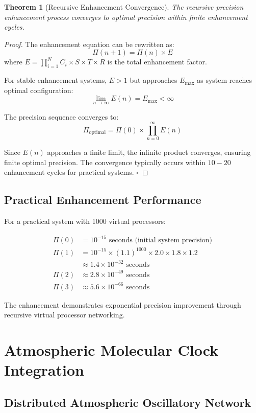 \documentclass[12pt,a4paper]{article}
\newtheorem{theorem}{Theorem}
\begin{document}
\begin{theorem}[Recursive Enhancement Convergence]
The recursive precision enhancement process converges to optimal precision within finite enhancement cycles.
\end{theorem}

\begin{proof}
The enhancement equation can be rewritten as:
$$\Pi(n+1) = \Pi(n) \times E$$
where $E = \prod_{i=1}^{N} C_i \times S \times T \times R$ is the total enhancement factor.

For stable enhancement systems, $E > 1$ but approaches $E_{\text{max}}$ as system reaches optimal configuration:
$$\lim_{n \to \infty} E(n) = E_{\text{max}} < \infty$$

The precision sequence converges to:
$$\Pi_{\text{optimal}} = \Pi(0) \times \prod_{n=0}^{\infty} E(n)$$

Since $E(n)$ approaches a finite limit, the infinite product converges, ensuring finite optimal precision. The convergence typically occurs within $10-20$ enhancement cycles for practical systems. $\square$
\end{proof}

\subsection{Practical Enhancement Performance}

For a practical system with 1000 virtual processors:

\begin{align}
\Pi(0) &= 10^{-15} \text{ seconds (initial system precision)} \\
\Pi(1) &= 10^{-15} \times (1.1)^{1000} \times 2.0 \times 1.8 \times 1.2 \\
       &\approx 1.4 \times 10^{-32} \text{ seconds} \\
\Pi(2) &\approx 2.8 \times 10^{-49} \text{ seconds} \\
\Pi(3) &\approx 5.6 \times 10^{-66} \text{ seconds}
\end{align}

The enhancement demonstrates exponential precision improvement through recursive virtual processor networking.

\section{Atmospheric Molecular Clock Integration}

\subsection{Distributed Atmospheric Oscillatory Network}
\end{document}
